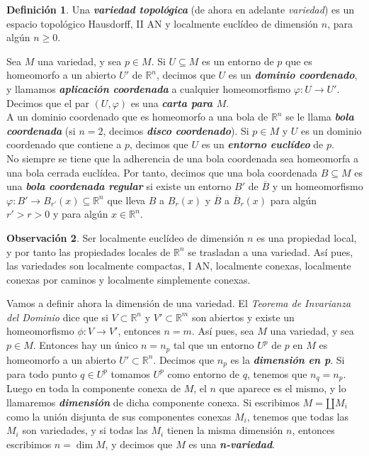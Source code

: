 \documentclass[10pt]{report}
\newcommand{\R}{\mathbb{R}}
\DeclareMathOperator{\dimension}{dim} %
\newcommand{\enfatiza}[1]{\textbf{\textit{#1}}}
\theoremstyle{definition}
\newtheorem{defin}{Definición}[section]
\newtheorem{obs}[defin]{Observación}
\begin{document}
\begin{defin}\label{def:variedad}%
Una \textbf{\emph{variedad topológica}} (de ahora en adelante \emph{variedad}) es un espacio topológico Hausdorff, II AN y localmente euclídeo de dimensión $n$, para algún $n\geq 0$.
\end{defin}
Sea $M$ una variedad, y sea $p\in M$. Si $U\subseteq M$ es un entorno de $p$ que es homeomorfo a un abierto $U'$ de $\R^n$, decimos que $U$ es un \enfatiza{dominio coordenado}, y llamamos \enfatiza{aplicación coordenada} a cualquier homeomorfismo $\varphi :U\to U'$. Decimos que el par $(U,\varphi )$ es una \enfatiza{carta para $M$}.\\
A un dominio coordenado que es homeomorfo a una bola de $\R^n$ se le llama \enfatiza{bola coordenada} (si $n=2$, decimos \enfatiza{disco coordenado}). Si $p\in M$ y $U$ es un dominio coordenado que contiene a $p$, decimos que $U$ es un \enfatiza{entorno euclídeo} de $p$.\\
No siempre se tiene que la adherencia de una bola coordenada sea homeomorfa a una bola cerrada euclídea. Por tanto, decimos que una bola coordenada $B\subseteq M$ es una \enfatiza{bola coordenada regular} si existe un entorno $B'$ de $\overline{B}$ y un homeomorfismo $\varphi:B'\to B_{r'}(x)\subseteq \R^n$ que lleva $B$ a $B_r(x)$ y $\overline{B}$ a $\overline{B}_r(x)$ para algún $r'>r>0$ y para algún $x\in \R^n$.
\begin{obs}%
Ser localmente euclídeo de dimensión $n$ es una propiedad local, y por tanto las propiedades locales de $\R^n$ se trasladan a una variedad. Así pues, las variedades son localmente compactas, I AN, localmente conexas, localmente conexas por caminos y localmente simplemente conexas.
\end{obs}
Vamos a definir ahora la dimensión de una variedad. El \textit{Teorema de Invarianza del Dominio} dice que si $V\subset \R^n$ y $V'\subset \R^m$ son abiertos y existe un homeomorfismo $\phi: V \rightarrow V'$, entonces $n=m$. Así pues, sea $M$ una variedad, y sea $p\in M$. Entonces hay un único $n=n_p$ tal que un entorno $U^p$ de $p$ en $M$ es homeomorfo a un abierto $U'\subset \R^n$. Decimos que $n_p$ es la \enfatiza{dimensión en p}. Si para todo punto $q\in U^p$ tomamos $U^p$ como entorno de $q$, tenemos que $n_q=n_p$. Luego en toda la componente conexa de $M$, el $n$ que aparece es el mismo, y lo llamaremos \enfatiza{dimensión} de dicha componente conexa. Si escribimos $M=\amalg M_i$ como la unión disjunta de sus componentes conexas $M_i$, tenemos que todas las $M_i$ son variedades, y si todas las $M_i$ tienen la misma dimensión $n$, entonces escribimos $n=\dimension{M}$, y decimos que $M$ es una \enfatiza{n-variedad}.\\
\end{document}
